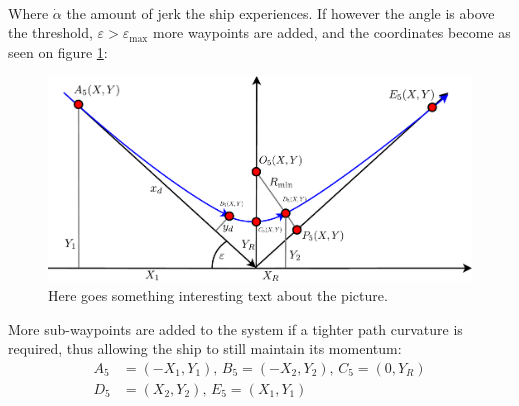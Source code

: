 \documentclass[a0,portrait]{a0poster}
\begin{document}
\begin{center}
{\begin{align}
\end{align}
Where $\dot{\alpha}$ the amount of jerk the ship experiences. If however the angle is above the threshold, $\varepsilon > \varepsilon_ \text{max}$ more waypoints are added, and the coordinates become as seen on figure \ref{fig:5points}:
\begin{figure}
	\centering %
	\includegraphics[width=\threecolwidth]{img/5points}
  	\caption{Here goes something interesting text about the picture.}
	\label{fig:5points}
\end{figure}
More sub-waypoints are added to the system if a tighter path curvature is required, thus allowing the ship to still maintain its momentum:
\begin{align}
A_\text{5} &= (-X_1,Y_1),\, B_\text{5} = (-X_2,Y_2),\, C_\text{5} = (0,Y_R)\\
D_\text{5} &= (X_2,Y_2),\, E_\text{5} = (X_1,Y_1)
\end{align}
}


\end{center}
\end{document}
